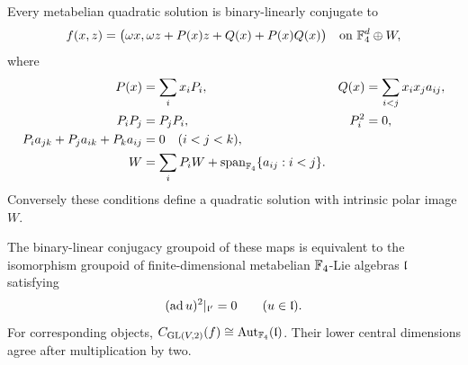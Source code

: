 \begin{theorem}\label{thm:correspondence}
Every metabelian quadratic solution is binary-linearly conjugate to
\begin{equation}\label{eq:normal-form}
 f(x,z)=\bigl(\omega x,\omega z+P(x)z+Q(x)+P(x)Q(x)\bigr)
       \quad\text{on }\mathbb F_4^d\oplus W,
\end{equation}
where
\begin{align}
 P(x)&=\sum_i x_iP_i,& Q(x)&=\sum_{i<j}x_ix_ja_{ij},\label{eq:PQ}\\
 P_iP_j&=P_jP_i,&P_i^2&=0,\label{eq:square-zero}\\
 P_i a_{jk}+P_j a_{ik}+P_k a_{ij}&=0\quad(i<j<k),
 \label{eq:triangle}\\
 W&=\sum_iP_iW+\operatorname{span}_{\mathbb F_4}\{a_{ij}:i<j\}.
 \label{eq:intrinsic-generation}
\end{align}
Conversely these conditions define a quadratic solution with intrinsic
polar image \(W\).

The binary-linear conjugacy groupoid of these maps is equivalent to the
isomorphism groupoid of finite-dimensional metabelian \(\mathbb F_4\)-Lie
algebras \(\mathfrak l\) satisfying
\begin{equation}\label{eq:Lie-action-square}
 (\operatorname{ad} u)^2|_{\mathfrak l'}=0\qquad(u\in\mathfrak l).
\end{equation}
For corresponding objects,
\(C_{\operatorname{GL}(V,2)}(f)\cong\operatorname{Aut}_{\mathbb F_4}(\mathfrak l)\).
Their lower central dimensions agree after multiplication by two.
\end{theorem}

